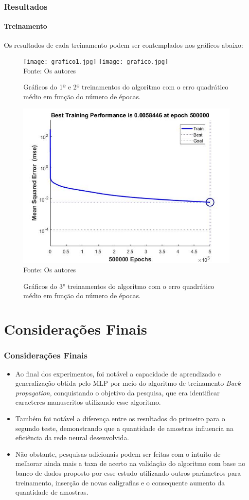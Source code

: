 	\begin{frame}
	\frametitle{Resultados}
	\framesubtitle{Treinamento}
	Os resultados de cada treinamento podem ser contemplados nos gráficos abaixo:
	\begin{figure}
		\centering
		\caption{Gráficos do 1º e 2º treinamentos do algoritmo com o erro quadrático médio em função do número de épocas.}
		\texttt{[image: grafico1.jpg]}
		\quad
		\texttt{[image: grafico.jpg]}\\
		{\scriptsize Fonte: Os autores}
		\label{figtextimg}
	\end{figure} 

\begin{figure}
	\centering
	\caption{Gráficos do 3° treinamentos do algoritmo com o erro quadrático médio em função do número de épocas.}
	\includegraphics[width=0.37 \linewidth]{grafico100.jpg}
		{\scriptsize Fonte: Os autores}
	\label{figtextimg}
\end{figure} 
	
\end{frame}
\section{Considerações Finais}
\begin{frame}
	\frametitle{Considerações Finais}
	\begin{itemize}
		\item Ao final dos experimentos, foi notável a capacidade de aprendizado e generalização obtida pelo MLP por meio do algoritmo de treinamento \textit{Back-propagation}, conquistando o objetivo da pesquisa, que era identificar caracteres manuscritos utilizando esse algoritmo.
		\item Também foi notável a diferença entre os resultados do primeiro para o segundo teste, demonstrando que a quantidade de amostras influencia na eficiência da rede neural desenvolvida.
		\item Não obstante, pesquisas adicionais podem ser feitas com o intuito de melhorar ainda mais a taxa de acerto na validação do algoritmo com base no banco de dados proposto por esse estudo utilizando outros parâmetros para treinamento, inserção de novas caligrafias e o consequente aumento da quantidade de amostras. 
	\end{itemize} 

\end{frame}


